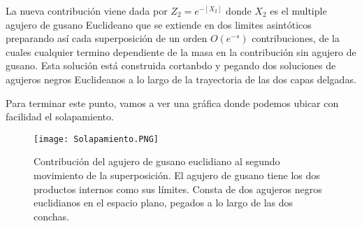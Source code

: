 \documentclass[letterpaper]{article}
\begin{document}
\begin{justify}
La nueva contribución viene dada por \(Z_2=e^{-[X_2]}\) donde \(X_2\) es el multiple agujero de gusano Euclideano que se extiende en dos limites asintóticos preparando así 
cada superposición de un orden \(\textit{O}\left(e^{-s}\right)\) contribuciones, de la cuales cualquier termino dependiente de la masa en la contribución
sin agujero de gusano. Esta solución está construida cortanbdo y pegando dos soluciones de agujeros negros Euclideanos a lo largo de la trayectoria de las dos capas delgadas.
\end{justify}
\begin{justify}
Para terminar este punto, vamos a ver una gráfica donde podemos ubicar con facilidad el solapamiento.

\begin{figure}[h]
    \centering
    \texttt{[image: Solapamiento.PNG]}
    \caption{Contribución del agujero de gusano euclidiano al segundo movimiento de la superposición. El agujero de gusano tiene los dos productos internos como sus límites. Consta de dos agujeros negros euclidianos en el espacio plano, pegados a lo largo de las dos conchas. }   
\end{figure}
\end{justify}
\end{document}
